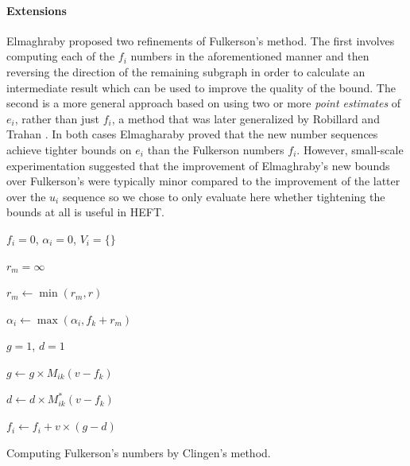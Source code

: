 \documentclass[12pt]{article}
\begin{document}
\paragraph{Extensions}
\label{para.fulkerson_extensions}

Elmaghraby \cite{elmaghraby67} proposed two refinements of Fulkerson's method. The first involves computing each of the $f_i$ numbers in the aforementioned manner and then reversing the direction of the remaining subgraph in order to calculate an intermediate result which can be used to improve the quality of the bound. The second is a more general approach based on using two or more {\em point estimates} of $e_i$, rather than just $f_i$, a method that was later generalized by Robillard and Trahan \cite{robillard76}. In both cases Elmagharaby proved that the new number sequences achieve tighter bounds on $e_i$ than the Fulkerson numbers $f_i$. However, small-scale experimentation suggested that the improvement of Elmaghraby's new bounds over Fulkerson's were typically minor compared to the improvement of the latter over the $u_i$ sequence so we chose to only evaluate here whether tightening the bounds at all is useful in HEFT.

\begin{algorithm}	
	
	{	
		$f_i = 0$, $\alpha_i = 0$, $V_i = \{\}$
		
		{
			$r_m = \infty$
			
			{
				$r_m \leftarrow \min(r_m, r)$
				
			}
			
			$\alpha_i \leftarrow \max(\alpha_i, f_k + r_m)$
		}
		
		
		{
			{
				$g = 1$, $d = 1$
				
				{
					$g \leftarrow g \times M_{ik}(v - f_k)$
					
					$d \leftarrow d \times M_{ik}^{*}(v - f_k)$
				}
				
				$f_i \leftarrow f_i + v \times (g - d)$				
			}
		}		
	}	
	\caption{Computing Fulkerson's numbers by Clingen's method.}
	\label{alg.fulkerson}
\end{algorithm} 
\end{document}
